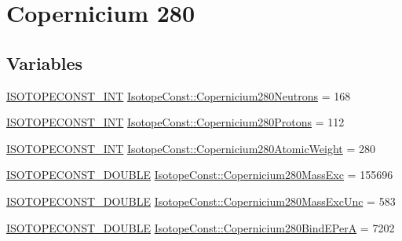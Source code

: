 \hypertarget{group___isotope_const-_copernicium-_cn280}{}\section{Copernicium 280}
\label{group___isotope_const-_copernicium-_cn280}
\subsection*{Variables}
\begin{DoxyCompactItemize}
\item 
\mbox{\hyperlink{group___isotope_const-_macros_ga5f18360b3e99483a35c32d789e62621c}{I\+S\+O\+T\+O\+P\+E\+C\+O\+N\+S\+T\+\_\+\+I\+NT}} \mbox{\hyperlink{group___isotope_const-_copernicium-_cn280_ga64cbb55b875f97cc6405ac5b90b477c0}{Isotope\+Const\+::\+Copernicium280\+Neutrons}} = 168
\item 
\mbox{\hyperlink{group___isotope_const-_macros_ga5f18360b3e99483a35c32d789e62621c}{I\+S\+O\+T\+O\+P\+E\+C\+O\+N\+S\+T\+\_\+\+I\+NT}} \mbox{\hyperlink{group___isotope_const-_copernicium-_cn280_ga7b25a159ee0df225f49af0deed6faf3d}{Isotope\+Const\+::\+Copernicium280\+Protons}} = 112
\item 
\mbox{\hyperlink{group___isotope_const-_macros_ga5f18360b3e99483a35c32d789e62621c}{I\+S\+O\+T\+O\+P\+E\+C\+O\+N\+S\+T\+\_\+\+I\+NT}} \mbox{\hyperlink{group___isotope_const-_copernicium-_cn280_gad5c4112b1f713c410000a5a5ab435b3c}{Isotope\+Const\+::\+Copernicium280\+Atomic\+Weight}} = 280
\item 
\mbox{\hyperlink{group___isotope_const-_macros_ga8f45a7272ce02c0b4c65c44636ed719a}{I\+S\+O\+T\+O\+P\+E\+C\+O\+N\+S\+T\+\_\+\+D\+O\+U\+B\+LE}} \mbox{\hyperlink{group___isotope_const-_copernicium-_cn280_ga86c5173e515b6a6b45249f00e4d77522}{Isotope\+Const\+::\+Copernicium280\+Mass\+Exc}} = 155696
\item 
\mbox{\hyperlink{group___isotope_const-_macros_ga8f45a7272ce02c0b4c65c44636ed719a}{I\+S\+O\+T\+O\+P\+E\+C\+O\+N\+S\+T\+\_\+\+D\+O\+U\+B\+LE}} \mbox{\hyperlink{group___isotope_const-_copernicium-_cn280_ga897ebf85375ddcf4e713040fffffde82}{Isotope\+Const\+::\+Copernicium280\+Mass\+Exc\+Unc}} = 583
\item 
\mbox{\hyperlink{group___isotope_const-_macros_ga8f45a7272ce02c0b4c65c44636ed719a}{I\+S\+O\+T\+O\+P\+E\+C\+O\+N\+S\+T\+\_\+\+D\+O\+U\+B\+LE}} \mbox{\hyperlink{group___isotope_const-_copernicium-_cn280_ga9ddca92c5b3a07ae43d83a78d5b75739}{Isotope\+Const\+::\+Copernicium280\+Bind\+E\+PerA}} = 7202

\end{DoxyCompactItemize}

